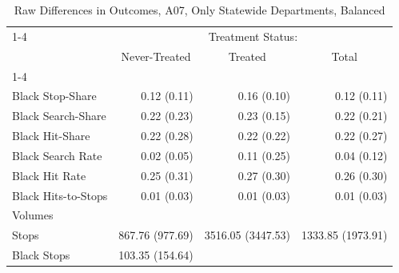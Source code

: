 \begin{table}[!h]
\caption{Raw Differences in Outcomes, A07, Only Statewide Departments, Balanced}
\centering
\begin{tabular}{llll}
\cline{1-4}
\multicolumn{1}{r}{} &
  \multicolumn{3}{c}{Treatment Status:} \\
\multicolumn{1}{r}{} &
  \multicolumn{1}{c}{Never-Treated} &
  \multicolumn{1}{c}{Treated} &
  \multicolumn{1}{c}{Total} \\
\cline{1-4}
\multicolumn{1}{l}{Rates} &
  \multicolumn{1}{r}{} &
  \multicolumn{1}{r}{} &
  \multicolumn{1}{r}{} \\
\multicolumn{1}{l}{\hspace{1em}Black Stop-Share} &
  \multicolumn{1}{r}{0.12 (0.11)} &
  \multicolumn{1}{r}{0.16 (0.10)} &
  \multicolumn{1}{r}{0.12 (0.11)} \\
\multicolumn{1}{l}{\hspace{1em}Black Search-Share} &
  \multicolumn{1}{r}{0.22 (0.23)} &
  \multicolumn{1}{r}{0.23 (0.15)} &
  \multicolumn{1}{r}{0.22 (0.21)} \\
\multicolumn{1}{l}{\hspace{1em}Black Hit-Share} &
  \multicolumn{1}{r}{0.22 (0.28)} &
  \multicolumn{1}{r}{0.22 (0.22)} &
  \multicolumn{1}{r}{0.22 (0.27)} \\
\multicolumn{1}{l}{\hspace{1em}Black Search Rate} &
  \multicolumn{1}{r}{0.02 (0.05)} &
  \multicolumn{1}{r}{0.11 (0.25)} &
  \multicolumn{1}{r}{0.04 (0.12)} \\
\multicolumn{1}{l}{\hspace{1em}Black Hit Rate} &
  \multicolumn{1}{r}{0.25 (0.31)} &
  \multicolumn{1}{r}{0.27 (0.30)} &
  \multicolumn{1}{r}{0.26 (0.30)} \\
\multicolumn{1}{l}{\hspace{1em}Black Hits-to-Stops} &
  \multicolumn{1}{r}{0.01 (0.03)} &
  \multicolumn{1}{r}{0.01 (0.03)} &
  \multicolumn{1}{r}{0.01 (0.03)} \\
\multicolumn{1}{l}{Volumes} &
  \multicolumn{1}{r}{} &
  \multicolumn{1}{r}{} &
  \multicolumn{1}{r}{} \\
\multicolumn{1}{l}{\hspace{1em}Stops} &
  \multicolumn{1}{r}{867.76 (977.69)} &
  \multicolumn{1}{r}{3516.05 (3447.53)} &
  \multicolumn{1}{r}{1333.85 (1973.91)} \\
\multicolumn{1}{l}{\hspace{1em}Black Stops} &
  \multicolumn{1}{r}{103.35 (154.64)} &

\end{tabular}
\end{table}
